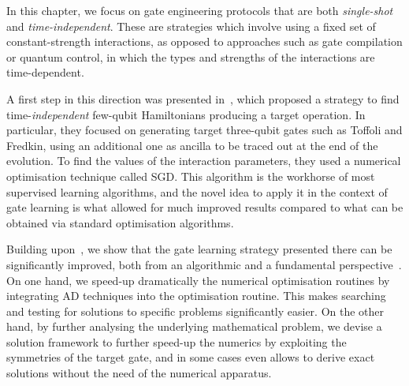 In this chapter, we focus on gate engineering protocols that are both \emph{single-shot} and \emph{time-independent}.
These are strategies which involve using a fixed set of constant-strength interactions, as opposed to approaches such as gate compilation or quantum control, in which the types and strengths of the interactions are time-dependent.

A first step in this direction was presented in~\cite{banchi2016quantum}, which proposed a strategy to find time-\emph{independent} few-qubit Hamiltonians producing a target operation.
In particular, they focused on generating target three-qubit gates such as Toffoli and Fredkin, using an additional one as ancilla to be traced out at the end of the evolution.
To find the values of the interaction parameters, they used a numerical optimisation technique called \ac{SGD}. This algorithm is the workhorse of most supervised learning algorithms, and the novel idea to apply it in the context of gate learning is what allowed for much improved results compared to what can be obtained via standard optimisation algorithms.

Building upon~\cite{banchi2016quantum}, we show that the gate learning strategy presented there can be significantly improved, both from an algorithmic and a fundamental perspective~\cite{innocenti2018supervised}.
On one hand, we speed-up dramatically the numerical optimisation routines by integrating \ac{AD} techniques into the optimisation routine. This makes searching and testing for solutions to specific problems significantly easier.
On the other hand, by further analysing the underlying mathematical problem, we devise a solution framework to further speed-up the numerics by exploiting the symmetries of the target gate, and in some cases even allows to derive exact solutions without the need of the numerical apparatus.

